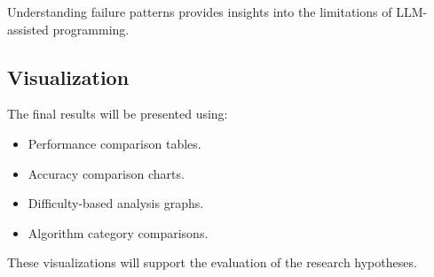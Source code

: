 Understanding failure patterns provides insights into the limitations of
LLM-assisted programming.



\subsection{Visualization}


The final results will be presented using:


\begin{itemize}

\item Performance comparison tables.

\item Accuracy comparison charts.

\item Difficulty-based analysis graphs.

\item Algorithm category comparisons.

\end{itemize}


These visualizations will support the evaluation of the research hypotheses.
